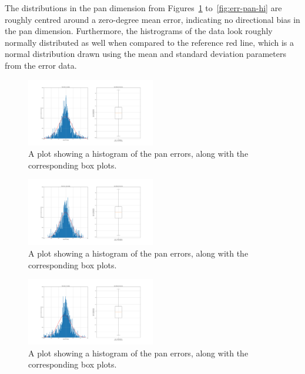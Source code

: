\documentclass[format=sigconf, review=true, screen=true, anonymous=true]{acmart}
\begin{document}
The distributions in the pan dimension from Figures~\ref{fig:pan-err-lo} to~\ref{fig:err-pan-hi} are roughly centred around a zero-degree mean error, indicating no directional bias in the pan dimension. Furthermore, the histrograms of the data look roughly normally distributed as well when compared to the reference red line, which is a normal distribution drawn using the mean and standard deviation parameters from the error data. 

\begin{figure}
  \centering
  \includegraphics[width=0.5\textwidth]{figures/pan_err_lo.png}
  \caption{A plot showing a histogram of the pan errors, along with the corresponding box plots. }
  \label{fig:pan-err-lo}
\end{figure}

\begin{figure}
  \centering
  \includegraphics[width=0.5\textwidth]{figures/pan_err_med.png}
  \caption{A plot showing a histogram of the pan errors, along with the corresponding box plots. }
  \label{fig:pan-err-med}
\end{figure}

\begin{figure}
  \centering
  \includegraphics[width=0.5\textwidth]{figures/pan_err_hi.png}
  \caption{A plot showing a histogram of the pan errors, along with the corresponding box plots. }
  \label{fig:location-guesses}
  \label{fig:pan-err-hi}
\end{figure}
\end{document}
